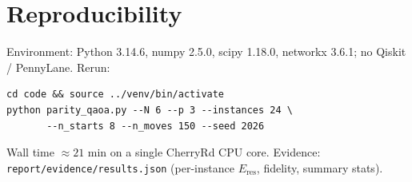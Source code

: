 \documentclass[11pt]{article}
\begin{document}
\section{Reproducibility}
Environment: Python 3.14.6, numpy 2.5.0, scipy 1.18.0, networkx 3.6.1;
no Qiskit / PennyLane. Rerun:
\begin{lstlisting}
cd code && source ../venv/bin/activate
python parity_qaoa.py --N 6 --p 3 --instances 24 \
       --n_starts 8 --n_moves 150 --seed 2026
\end{lstlisting}
Wall time $\approx 21$ min on a single CherryRd CPU core.
Evidence: \texttt{report/evidence/results.json} (per-instance
$E_{\mathrm{res}}$, fidelity, summary stats).


\end{document}
